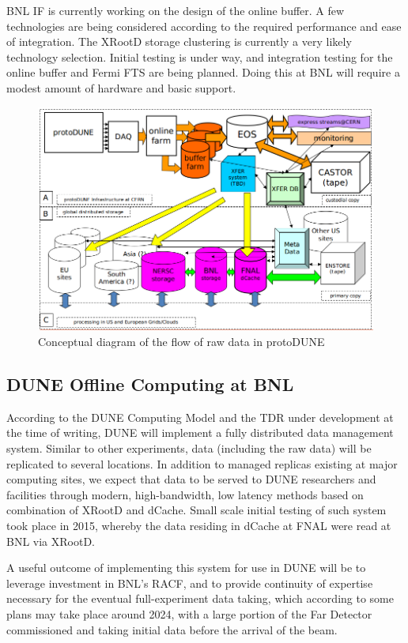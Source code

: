 \documentclass[pdftex,12pt,letter]{article}
\begin{document}
BNL IF is currently working on the design of the online buffer. A few technologies are being considered
according to the required performance and ease of integration. The XRootD storage clustering is currently
a very likely technology selection. Initial testing is under way, and integration testing for the online buffer
and Fermi FTS are being planned. Doing this at BNL will require a modest amount
of hardware and basic support.


\begin{figure}[tbh]
\centering\includegraphics[width=0.8\linewidth]{protoDUNE_raw_data_concept.png}
\caption{\label{fig:raw_concept}Conceptual diagram of the flow of raw data in protoDUNE}
\end{figure}

\subsection{DUNE Offline Computing at BNL}
According to the DUNE Computing Model and the TDR under development at the time of writing,
DUNE will implement a fully distributed data management system. Similar to other experiments,
data (including the raw data) will be replicated to several locations. In addition to managed
replicas existing at major computing sites, we expect that data to be  served to DUNE
researchers and facilities through modern, high-bandwidth, low
latency methods based on combination of XRootD and dCache. Small scale initial testing
of such system took place in 2015, whereby the data residing in dCache at FNAL were read
at BNL via XRootD.

A useful outcome of implementing this system for use in DUNE will be to leverage
investment in BNL's RACF, and to
provide continuity of expertise necessary for the eventual
full-experiment data taking, which according to some plans may take
place around 2024, with a large portion of the Far Detector
commissioned and taking initial data before the arrival of the beam.
\end{document}
